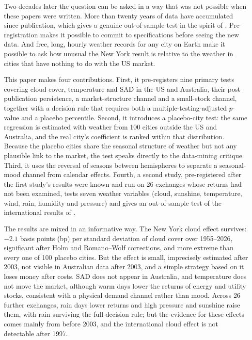 \documentclass[11pt]{article}
\begin{document}
Two decades later the question can be asked in a way that was not possible when these papers were
written. More than twenty years of data have accumulated since publication, which gives a genuine
out-of-sample test in the spirit of \citet{mclean2016}. Pre-registration makes it possible to
commit to specifications before seeing the new data. And free, long, hourly weather records for
any city on Earth make it possible to ask how unusual the New York result is relative to the
weather in cities that have nothing to do with the US market.

This paper makes four contributions. First, it pre-registers nine primary tests covering cloud
cover, temperature and SAD in the US and Australia, their post-publication persistence, a
market-structure channel and a small-stock channel, together with a decision rule that requires
both a multiple-testing-adjusted $p$-value and a placebo percentile. Second, it introduces a
placebo-city test: the same regression is estimated with weather from 100 cities outside the US
and Australia, and the real city's coefficient is ranked within that distribution. Because the
placebo cities share the seasonal structure of weather but not any plausible link to the market,
the test speaks directly to the data-mining critique. Third, it uses the reversal of seasons
between hemispheres to separate a seasonal-mood channel from calendar effects. Fourth, a second
study, pre-registered after the first study's results were known and run on 26 exchanges whose
returns had not been examined, tests seven weather variables (cloud, sunshine, temperature, wind,
rain, humidity and pressure) and gives an out-of-sample test of the international results of
\citet{hirshleifer2003}.

The results are mixed in an informative way. The New York cloud effect survives: $-2.1$ basis
points (bp) per standard deviation of cloud cover over 1955--2026, significant after Holm and
Romano--Wolf corrections, and more extreme than every one of 100 placebo cities. But the effect is
small, imprecisely estimated after 2003, not visible in Australian data after 2003, and a simple
strategy based on it loses money after costs. SAD does not appear in Australia, and temperature does not move the
market, although warm days lower the returns of energy and utility stocks, consistent with a
physical demand channel rather than mood. Across 26 further exchanges, rain days lower returns and
high pressure and sunshine raise them, with rain surviving the full decision rule; but the
evidence for these effects comes mainly from before 2003, and the international cloud effect is not
detectable after 1997.
\end{document}

